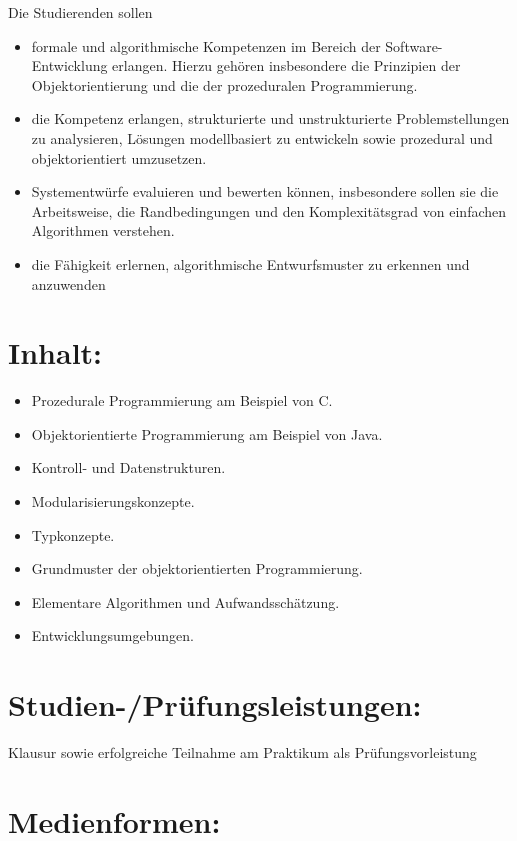 Die Studierenden sollen

\begin{itemize}
\tightlist
\item
  formale und algorithmische Kompetenzen im Bereich der
  Software-Entwicklung erlangen. Hierzu gehören insbesondere die
  Prinzipien der Objektorientierung und die der prozeduralen
  Programmierung.
\item
  die Kompetenz erlangen, strukturierte und unstrukturierte
  Problemstellungen zu analysieren, Lösungen modellbasiert zu entwickeln
  sowie prozedural und objektorientiert umzusetzen.
\item
  Systementwürfe evaluieren und bewerten können, insbesondere sollen sie
  die Arbeitsweise, die Randbedingungen und den Komplexitätsgrad von
  einfachen Algorithmen verstehen.
\item
  die Fähigkeit erlernen, algorithmische Entwurfsmuster zu erkennen und
  anzuwenden
\end{itemize}

\section*{Inhalt:}\label{inhalt}

\begin{itemize}
\tightlist
\item
  Prozedurale Programmierung am Beispiel von C.
\item
  Objektorientierte Programmierung am Beispiel von Java.
\item
  Kontroll- und Datenstrukturen.
\item
  Modularisierungskonzepte.
\item
  Typkonzepte.
\item
  Grundmuster der objektorientierten Programmierung.
\item
  Elementare Algorithmen und Aufwandsschätzung.
\item
  Entwicklungsumgebungen.
\end{itemize}

\section*{Studien-/Prüfungsleistungen:}\label{studien-pruxfcfungsleistungen}

Klausur sowie erfolgreiche Teilnahme am Praktikum als
Prüfungsvorleistung

\section*{Medienformen:}\label{medienformen}


